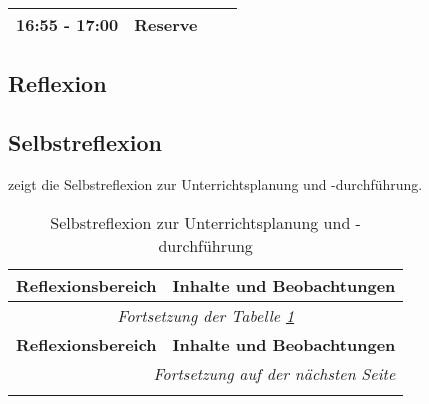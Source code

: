 \documentclass[
11pt,
captions=tableheading,
smallheadings,
headsepline,
footsepline, 
captions=tableheading,
parskip=half-,
]{scrartcl}
\begin{document}
\begin{landscape}
\begin{longtable}{@{}l|p{8.75cm}p{7.75cm}p{5.25cm}@{}}
        \midrule
        16:55 - 17:00 & \textbf{Reserve}{}                                                                                                                                              & {}                                                                                                             & {}                                                                                \\

        \bottomrule
    \end{longtable}
\end{landscape}
\clearpage

\begin{landscape}

    \section{Reflexion}
    \subsection{Selbstreflexion}
     zeigt die Selbstreflexion zur Unterrichtsplanung und -durchf\"uhrung.

    \begin{longtable}{@{}p{8cm}|p{16cm}@{}}
        \caption{Selbstreflexion zur Unterrichtsplanung und -durchf\"uhrung} \label{tab:Reflexion}                                                                                                     \\
        \toprule
        \textbf{Reflexionsbereich}                                                                                                                                & \textbf{Inhalte und Beobachtungen} \\
        \midrule
        \endfirsthead
        \multicolumn{2}{c}{\textit{Fortsetzung der Tabelle \ref{tab:Reflexion}}}                                                                                                                       \\
        \toprule
        \textbf{Reflexionsbereich}                                                                                                                                & \textbf{Inhalte und Beobachtungen} \\
        \midrule
        \endhead
        \midrule
        \multicolumn{2}{r}{\textit{Fortsetzung auf der n\"achsten Seite}}                                                                                                                              \\
        \midrule
        \endfoot
        \bottomrule
        \endlastfoot


\end{longtable}
\end{landscape}
\end{document}
